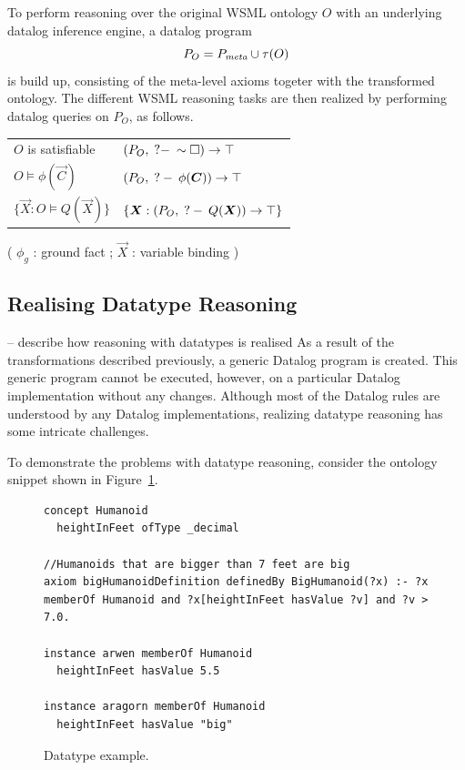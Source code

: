 To perform reasoning over the original WSML ontology $O$ with an
underlying datalog inference engine, a datalog program
\begin{displaymath}
    P_O = \mlaxioms \cup \tau(O)
\end{displaymath}
is build up, consisting of the meta-level axioms togeter with the
transformed ontology. The different WSML reasoning tasks are then
realized by performing datalog queries on $P_O$, as follows.
\begin{small}
\begin{tabular}{|l|l|}
  \hline
  $O$ is satisfiable & $(P_O, \;?-\: \sim \square) \rightarrow \top$ \\
  $O \models \phi(\vec{C})$ & $(P_O, \qury \phi(\vec{C})) \rightarrow \top$ \\
  $\{\vec{X} : O \models Q(\vec{X})\}$ & $\{\vec{X} : (P_O, \qury Q(\vec{X})) \rightarrow \top\}$ \\
 \hline
\end{tabular}
\end{small}

( $\phi_g$ : ground fact ; $\vec{X}$ : variable binding )


\subsection{Realising Datatype Reasoning}
-- describe how reasoning with datatypes is realised As a result
of the transformations described previously, a generic Datalog
program is created. This generic program cannot be executed,
however, on a particular Datalog implementation without any
changes. Although most of the Datalog rules are understood by any
Datalog implementations, realizing datatype reasoning has some
intricate challenges.

To demonstrate the problems with datatype reasoning, consider the
ontology snippet shown in Figure~\ref{fig:datatype_example}.

\begin{figure}[hbt]
\centering
\begin{lstlisting}[style=wsml, frame=none]
concept Humanoid
  heightInFeet ofType _decimal

//Humanoids that are bigger than 7 feet are big
axiom bigHumanoidDefinition definedBy BigHumanoid(?x) :- ?x
memberOf Humanoid and ?x[heightInFeet hasValue ?v] and ?v > 7.0.

instance arwen memberOf Humanoid
  heightInFeet hasValue 5.5

instance aragorn memberOf Humanoid
  heightInFeet hasValue "big"
\end{lstlisting}
 \caption{Datatype example. \label{fig:datatype_example}}
\end{figure}

